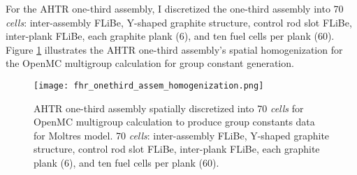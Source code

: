For the \gls{AHTR} one-third assembly, I discretized the one-third assembly into 
70 \textit{cells}: inter-assembly \gls{FLiBe}, Y-shaped graphite structure, control 
rod slot \gls{FLiBe}, inter-plank \gls{FLiBe}, each graphite plank (6), and ten fuel 
cells per plank (60).
Figure \ref{fig:fhr_onethird_assem_homogenization} illustrates the \gls{AHTR} 
one-third assembly's spatial homogenization for the OpenMC multigroup calculation
for group constant generation. 
\begin{figure}[htbp]
    \centering
    \texttt{[image: fhr\_onethird\_assem\_homogenization.png]}
    \raggedright
    \caption{\acrfull{AHTR} one-third assembly spatially discretized into 
    70 \textit{cells} for OpenMC multigroup calculation to produce group constants 
    data for Moltres model.
    70 \textit{cells}: inter-assembly \gls{FLiBe}, Y-shaped graphite structure, control 
    rod slot \gls{FLiBe}, inter-plank \gls{FLiBe}, each graphite plank (6), and ten fuel 
    cells per plank (60).}
    \label{fig:fhr_onethird_assem_homogenization}
\end{figure}

